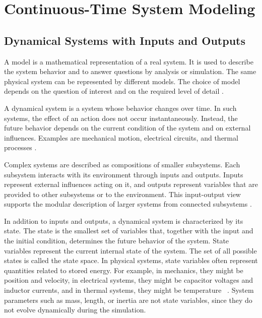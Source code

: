 \section{Continuous-Time System Modeling}
\label{sec:21_continuous_time}

\subsection{Dynamical Systems with Inputs and Outputs}
\label{sec:211_dynamical_systems}

A model is a mathematical representation of a real system.
It is used to describe the system behavior and to answer questions by analysis or simulation.
The same physical system can be represented by different models.
The choice of model depends on the question of interest and on the required level of detail \cite{astrom_feedback_2008, karnopp_system_2012}.

A dynamical system is a system whose behavior changes over time.
In such systems, the effect of an action does not occur instantaneously.
Instead, the future behavior depends on the current condition of the system and on external influences.
Examples are mechanical motion, electrical circuits, and thermal processes \cite{astrom_feedback_2008}.

Complex systems are  described as compositions of smaller subsystems.
Each subsystem interacts with its environment through inputs and outputs.
Inputs represent external influences acting on it, and outputs represent variables that are provided to other subsystems or to the environment.
This input-output view supports the modular description of larger systems from connected subsystems \cite{karnopp_system_2012}.

In addition to inputs and outputs, a dynamical system is characterized by its state.
The state is the smallest set of variables that, together with the input and the initial condition, determines the future behavior of the system.
State variables represent the current internal state of the system.
The set of all possible states is called the state space.
In physical systems, state variables often represent quantities related to stored energy.
For example, in mechanics, they might be position and velocity, in electrical systems, they might be capacitor voltages and inductor currents, and in thermal systems, they might be temperature ~\cite{astrom_feedback_2008,karnopp_system_2012}.
System parameters such as mass, length, or inertia are not state variables, since they do not evolve dynamically during the simulation.

